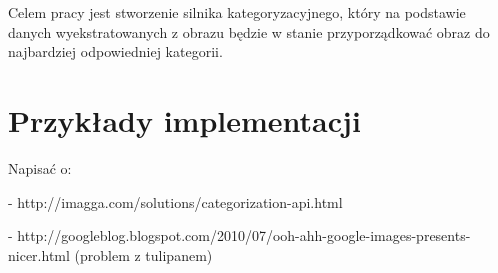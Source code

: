 Celem pracy jest stworzenie silnika kategoryzacyjnego, który na podstawie danych wyekstratowanych z obrazu będzie w stanie przyporządkować obraz do najbardziej odpowiedniej kategorii.

\section*{Przykłady implementacji}
Napisać o:

- http://imagga.com/solutions/categorization-api.html

- http://googleblog.blogspot.com/2010/07/ooh-ahh-google-images-presents-nicer.html (problem z tulipanem)